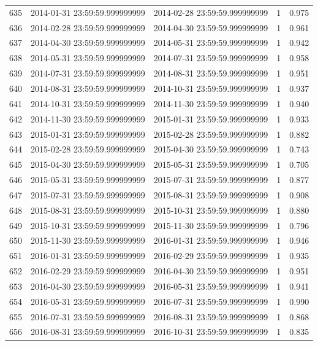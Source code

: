 \begin{table}
\begin{tabular}{lcccc}
635 & 2014-01-31 23:59:59.999999999 & 2014-02-28 23:59:59.999999999 & 1 & 0.975 \\
636 & 2014-02-28 23:59:59.999999999 & 2014-04-30 23:59:59.999999999 & 1 & 0.961 \\
637 & 2014-04-30 23:59:59.999999999 & 2014-05-31 23:59:59.999999999 & 1 & 0.942 \\
638 & 2014-05-31 23:59:59.999999999 & 2014-07-31 23:59:59.999999999 & 1 & 0.958 \\
639 & 2014-07-31 23:59:59.999999999 & 2014-08-31 23:59:59.999999999 & 1 & 0.951 \\
640 & 2014-08-31 23:59:59.999999999 & 2014-10-31 23:59:59.999999999 & 1 & 0.937 \\
641 & 2014-10-31 23:59:59.999999999 & 2014-11-30 23:59:59.999999999 & 1 & 0.940 \\
642 & 2014-11-30 23:59:59.999999999 & 2015-01-31 23:59:59.999999999 & 1 & 0.933 \\
643 & 2015-01-31 23:59:59.999999999 & 2015-02-28 23:59:59.999999999 & 1 & 0.882 \\
644 & 2015-02-28 23:59:59.999999999 & 2015-04-30 23:59:59.999999999 & 1 & 0.743 \\
645 & 2015-04-30 23:59:59.999999999 & 2015-05-31 23:59:59.999999999 & 1 & 0.705 \\
646 & 2015-05-31 23:59:59.999999999 & 2015-07-31 23:59:59.999999999 & 1 & 0.877 \\
647 & 2015-07-31 23:59:59.999999999 & 2015-08-31 23:59:59.999999999 & 1 & 0.908 \\
648 & 2015-08-31 23:59:59.999999999 & 2015-10-31 23:59:59.999999999 & 1 & 0.880 \\
649 & 2015-10-31 23:59:59.999999999 & 2015-11-30 23:59:59.999999999 & 1 & 0.796 \\
650 & 2015-11-30 23:59:59.999999999 & 2016-01-31 23:59:59.999999999 & 1 & 0.946 \\
651 & 2016-01-31 23:59:59.999999999 & 2016-02-29 23:59:59.999999999 & 1 & 0.935 \\
652 & 2016-02-29 23:59:59.999999999 & 2016-04-30 23:59:59.999999999 & 1 & 0.951 \\
653 & 2016-04-30 23:59:59.999999999 & 2016-05-31 23:59:59.999999999 & 1 & 0.941 \\
654 & 2016-05-31 23:59:59.999999999 & 2016-07-31 23:59:59.999999999 & 1 & 0.990 \\
655 & 2016-07-31 23:59:59.999999999 & 2016-08-31 23:59:59.999999999 & 1 & 0.868 \\
656 & 2016-08-31 23:59:59.999999999 & 2016-10-31 23:59:59.999999999 & 1 & 0.835 \\

\end{tabular}
\end{table}
